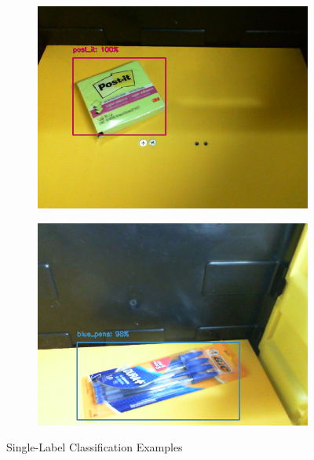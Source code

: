 \documentclass[openright]{normas-utf-tex} %
\begin{document}
\begin{figure}[H]
    \begin{subfigure}{0.5\textwidth}
        \centering
        \includegraphics[width=.95\textwidth]{./images/singlelabel-classification-1.png}
        \caption{}
    \end{subfigure}
    \begin{subfigure}{0.5\textwidth}
        \centering
        \includegraphics[width=.95\textwidth]{./images/singlelabel-classification-2.png}
        \caption{}
    \end{subfigure}
	\caption[Single-Label Classification Examples]{Single-Label Classification Examples}
    \label{fig:singleclassification}
\end{figure}
\end{document}
